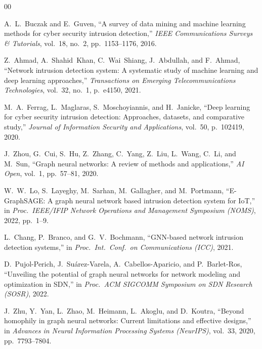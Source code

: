 \documentclass[conference]{IEEEtran}
\begin{document}

\begin{thebibliography}{00}

A.~L.~Buczak and E.~Guven, ``A survey of data mining and machine learning methods for cyber security intrusion detection,'' \textit{IEEE Communications Surveys \& Tutorials}, vol.~18, no.~2, pp.~1153--1176, 2016.

Z.~Ahmad, A.~Shahid~Khan, C.~Wai~Shiang, J.~Abdullah, and F.~Ahmad, ``Network intrusion detection system: A systematic study of machine learning and deep learning approaches,'' \textit{Transactions on Emerging Telecommunications Technologies}, vol.~32, no.~1, p.~e4150, 2021.

M.~A.~Ferrag, L.~Maglaras, S.~Moschoyiannis, and H.~Janicke, ``Deep learning for cyber security intrusion detection: Approaches, datasets, and comparative study,'' \textit{Journal of Information Security and Applications}, vol.~50, p.~102419, 2020.

J.~Zhou, G.~Cui, S.~Hu, Z.~Zhang, C.~Yang, Z.~Liu, L.~Wang, C.~Li, and M.~Sun, ``Graph neural networks: A review of methods and applications,'' \textit{AI Open}, vol.~1, pp.~57--81, 2020.

W.~W.~Lo, S.~Layeghy, M.~Sarhan, M.~Gallagher, and M.~Portmann, ``E-GraphSAGE: A graph neural network based intrusion detection system for IoT,'' in \textit{Proc.\ IEEE/IFIP Network Operations and Management Symposium (NOMS)}, 2022, pp.~1--9.

L.~Chang, P.~Branco, and G.~V.~Bochmann, ``GNN-based network intrusion detection systems,'' in \textit{Proc.\ Int.\ Conf.\ on Communications (ICC)}, 2021.

D.~Pujol-Perich, J.~Su\'{a}rez-Varela, A.~Cabellos-Aparicio, and P.~Barlet-Ros, ``Unveiling the potential of graph neural networks for network modeling and optimization in SDN,'' in \textit{Proc.\ ACM SIGCOMM Symposium on SDN Research (SOSR)}, 2022.

J.~Zhu, Y.~Yan, L.~Zhao, M.~Heimann, L.~Akoglu, and D.~Koutra, ``Beyond homophily in graph neural networks: Current limitations and effective designs,'' in \textit{Advances in Neural Information Processing Systems (NeurIPS)}, vol.~33, 2020, pp.~7793--7804.


\end{thebibliography}
\end{document}
